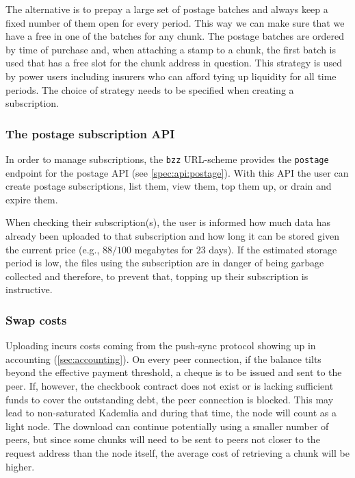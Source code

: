 The alternative is to prepay a large set of postage batches and always keep a fixed number of them open for every period. This way we can make sure that we have a free  in one of the batches for any chunk. The postage batches are ordered by time of purchase and, when attaching a stamp to a chunk, the first batch is used that has a free slot for the chunk address in question. This strategy is used by power users including insurers who can afford tying up liquidity for all time periods. The choice of strategy needs to be specified when creating a subscription.

\subsubsection{The postage subscription API}

In order to manage subscriptions, the \lstinline{bzz} URL-scheme provides the \lstinline{postage} endpoint for the postage API (see  \ref{spec:api:postage}). With this API the user can create postage subscriptions, list them, view them, top them up, or drain and expire them. 

When checking their subscription(s), the user is informed how much data has already been uploaded to that subscription and how long it can be stored given the current price (e.g., $88/100$ megabytes for $23$ days). If the estimated storage period is low, the files using the subscription are in danger of being garbage collected and therefore, to prevent that, topping up their subscription is instructive.


\subsubsection{Swap costs}

Uploading incurs  costs coming from the push-sync protocol showing up in  accounting (\ref{sec:accounting}). On every peer connection, if the balance tilts beyond the effective payment threshold, a cheque is to be issued and sent to the peer. If, however, the checkbook contract does not exist or is lacking sufficient funds to cover the outstanding debt, the peer connection is blocked. This may lead to non-saturated Kademlia and during that time, the node will count as a light node. The download can continue potentially using a smaller number of peers, but since some chunks will need to be sent to peers not closer to the request address than the node itself, the average cost of retrieving a chunk will be higher. 

